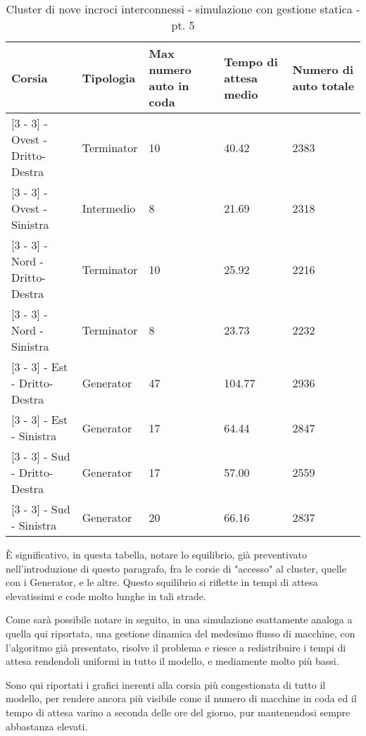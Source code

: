 \begin{table}[H]
\centering
\begin{tabular}{|C{2cm}|C{2cm}|C{3cm}|C{3cm}|C{3cm}|}
\hline
\textbf{Corsia} &
\textbf{Tipologia} &
\textbf{Max numero auto in coda} &
\textbf{Tempo di attesa medio} &
\textbf{Numero di auto totale} \\\hline
\scriptsize{[3 - 3] - Ovest - Dritto-Destra} &
Terminator &
10 &
40.42 &
2383 \\\hline
\scriptsize{[3 - 3] - Ovest - Sinistra} &
Intermedio &
8 &
21.69 &
2318 \\\hline
\scriptsize{[3 - 3] - Nord - Dritto-Destra} &
Terminator &
10 &
25.92 &
2216 \\\hline
\scriptsize{[3 - 3] - Nord - Sinistra} &
Terminator &
8 &
23.73 &
2232 \\\hline
\scriptsize{[3 - 3] - Est - Dritto-Destra} &
Generator &
47 &
104.77 &
2936 \\\hline
\scriptsize{[3 - 3] - Est - Sinistra} &
Generator &
17 &
64.44 &
2847 \\\hline
\scriptsize{[3 - 3] - Sud - Dritto-Destra} &
Generator &
17 &
57.00 &
2559 \\\hline
\scriptsize{[3 - 3] - Sud - Sinistra} &
Generator &
20 &
66.16 &
2837 \\\hline
\end{tabular}
\caption{Cluster di nove incroci interconnessi - simulazione con gestione statica - pt. 5}
\label{table:keytable}
\end{table}

È significativo, in questa tabella, notare lo squilibrio, già preventivato nell'introduzione di questo paragrafo, fra le corsie di "accesso" al cluster, quelle con i Generator, e le altre. Questo squilibrio si riflette in tempi di attesa elevatissimi e code molto lunghe in tali strade. 

Come sarà possibile notare in seguito, in una simulazione esattamente analoga a quella qui riportata, una gestione dinamica del medesimo flusso di macchine, con l'algoritmo già presentato, risolve il problema e riesce a redistribuire i tempi di attesa rendendoli uniformi in tutto il modello, e mediamente molto più bassi.

Sono qui riportati i grafici inerenti alla corsia più congestionata di tutto il modello, per rendere ancora più visibile come il numero di macchine in coda ed il tempo di attesa varino a seconda delle ore del giorno, pur mantenendosi sempre abbastanza elevati.
\newpage

